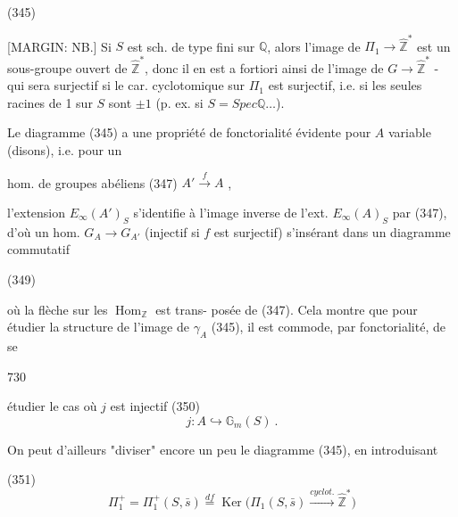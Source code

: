 (345)

[MARGIN: NB.] Si $S$ est sch. de type fini sur $\mathbb{Q}$, alors l'image de $\Pi_1 \to \hat{\mathbb{Z}}^*$ est un sous-groupe ouvert de $\hat{\mathbb{Z}}^*$, donc il en est a fortiori ainsi de l'image de $G \to \hat{\mathbb{Z}}^*$ - qui sera surjectif si le car. cyclotomique sur $\Pi_1$ est surjectif, i.e. si les seules racines de 1 sur $S$ sont $\pm 1$ (p. ex. si $S = Spec \mathbb{Q} \dots$).

Le diagramme (345) a
une propriété de fonctorialité évidente
pour $A$ variable (disons), i.e. pour un

\newpage


hom. de groupes abéliens
(347) $A' \xrightarrow{f} A$ ,

l'extension $E_{\infty}(A')_S$ s'identifie
à l'image inverse de l'ext. $E_{\infty}(A)_S$
par (347), d'où un hom.
$G_A \to G_{A'}$ (injectif si $f$ est surjectif)
s'insérant dans un diagramme
commutatif

(349)

où la flèche sur les $\operatorname{Hom}_{\mathbb{Z}}$ est trans-
posée de (347). Cela montre que
pour étudier la structure de l'image de $\gamma_A$ (345),
il est commode, par fonctorialité, de se

\newpage


730

étudier le cas où $j$ est injectif
(350) $$j : A \hookrightarrow \mathbb{G}_m(S) \ .$$

On peut d'ailleurs "diviser" encore un peu le diagramme (345), en introduisant

(351) $$\Pi_1^+ = \Pi_1^+(S, \bar{s}) \overset{df}{=} \operatorname{Ker}\Big(\Pi_1(S, \bar{s}) \overset{cyclot.}{\longrightarrow} \hat{\mathbb{Z}}^*\Big)$$

